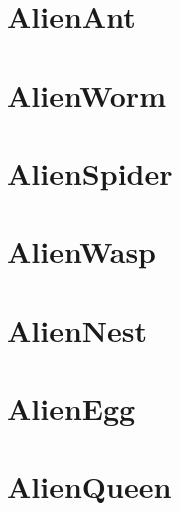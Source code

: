 \section{AlienAnt}
\section{AlienWorm}
\section{AlienSpider}
\section{AlienWasp}
\section{AlienNest}
\section{AlienEgg}
\section{AlienQueen}